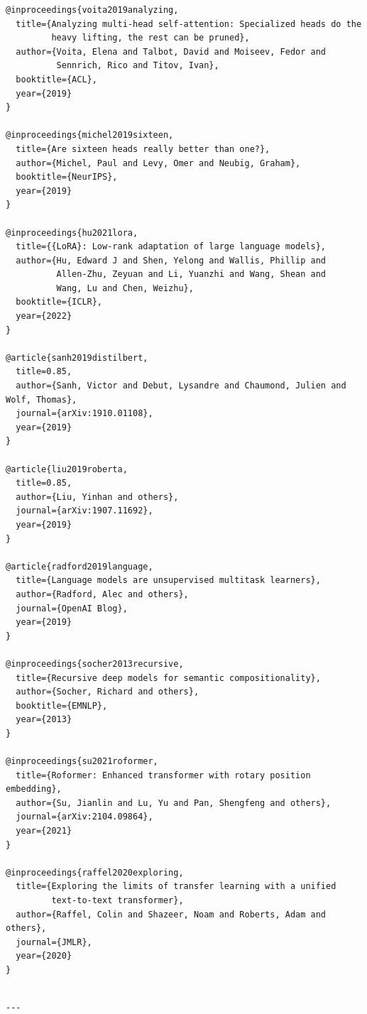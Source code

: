 \begin{lstlisting}
@inproceedings{voita2019analyzing,
  title={Analyzing multi-head self-attention: Specialized heads do the 
         heavy lifting, the rest can be pruned},
  author={Voita, Elena and Talbot, David and Moiseev, Fedor and 
          Sennrich, Rico and Titov, Ivan},
  booktitle={ACL},
  year={2019}
}

@inproceedings{michel2019sixteen,
  title={Are sixteen heads really better than one?},
  author={Michel, Paul and Levy, Omer and Neubig, Graham},
  booktitle={NeurIPS},
  year={2019}
}

@inproceedings{hu2021lora,
  title={{LoRA}: Low-rank adaptation of large language models},
  author={Hu, Edward J and Shen, Yelong and Wallis, Phillip and 
          Allen-Zhu, Zeyuan and Li, Yuanzhi and Wang, Shean and 
          Wang, Lu and Chen, Weizhu},
  booktitle={ICLR},
  year={2022}
}

@article{sanh2019distilbert,
  title=0.85,
  author={Sanh, Victor and Debut, Lysandre and Chaumond, Julien and Wolf, Thomas},
  journal={arXiv:1910.01108},
  year={2019}
}

@article{liu2019roberta,
  title=0.85,
  author={Liu, Yinhan and others},
  journal={arXiv:1907.11692},
  year={2019}
}

@article{radford2019language,
  title={Language models are unsupervised multitask learners},
  author={Radford, Alec and others},
  journal={OpenAI Blog},
  year={2019}
}

@inproceedings{socher2013recursive,
  title={Recursive deep models for semantic compositionality},
  author={Socher, Richard and others},
  booktitle={EMNLP},
  year={2013}
}

@inproceedings{su2021roformer,
  title={Roformer: Enhanced transformer with rotary position embedding},
  author={Su, Jianlin and Lu, Yu and Pan, Shengfeng and others},
  journal={arXiv:2104.09864},
  year={2021}
}

@inproceedings{raffel2020exploring,
  title={Exploring the limits of transfer learning with a unified 
         text-to-text transformer},
  author={Raffel, Colin and Shazeer, Noam and Roberts, Adam and others},
  journal={JMLR},
  year={2020}
}
\end{lstlisting}
\begin{lstlisting}

---
\end{lstlisting}